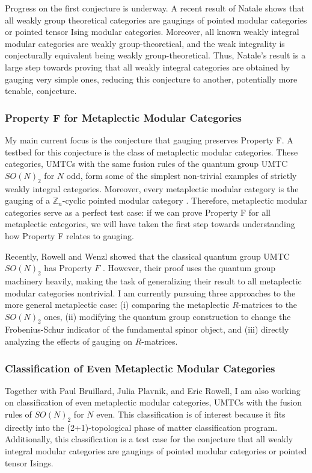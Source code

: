 \documentclass[12pt]{article}
\newcommand{\ZZ}{\mathbb{Z}}
\theoremstyle{plain} \numberwithin{equation}{section}
\theoremstyle{definition}
\begin{document}
Progress on the first conjecture is underway. A recent result of Natale \cite{n} shows that all weakly group theoretical categories are gaugings of pointed modular categories or pointed tensor Ising modular categories.  Moreover, all known weakly integral modular categories are weakly group-theoretical, and the weak integrality is conjecturally equivalent being weakly group-theoretical.  Thus, Natale's result is a large step towards proving that all weakly integral categories are obtained by gauging very simple ones, reducing this conjecture to another, potentially more tenable, conjecture.

\subsubsection*{Property F for Metaplectic Modular Categories}

My main current focus is the conjecture that gauging preserves Property F. A testbed for this conjecture is the class of metaplectic modular categories.  These categories, UMTCs with the same fusion rules of the quantum group UMTC $SO(N)_2$ for $N$ odd,  form some of the simplest non-trivial examples of strictly weakly integral categories.   Moreover, every metaplectic modular category is the gauging of a $\ZZ_n$-cyclic pointed modular category \cite{acrw}.  Therefore, metaplectic modular categories serve as a perfect test case:  if we can prove Property F for all metaplectic categories, we will have taken the first step towards understanding how Property F relates to gauging.  

Recently,  Rowell and Wenzl showed that the classical quantum group UMTC $SO(N)_2$ has Property $F$ \cite{rw}.  However, their proof uses the quantum group machinery heavily, making the task of generalizing their result to all metaplectic modular categories nontrivial.  I am currently pursuing three approaches  to the more general metaplectic case: (i) comparing the metaplectic $R$-matrices to the $SO(N)_2$ ones, (ii) modifying the quantum group construction to change the Frobenius-Schur indicator of the fundamental spinor object, and (iii) directly analyzing the effects of gauging on $R$-matrices.

\subsubsection*{Classification of Even Metaplectic Modular Categories}

Together with Paul Bruillard, Julia Plavnik, and Eric Rowell, I am also working on classification of even metaplectic modular categories, UMTCs with the fusion rules of $SO(N)_2$ for $N$ even. This classification is of interest because it fits directly into the (2+1)-topological phase of matter classification program.  Additionally, this classification is a test case for the conjecture that all weakly integral modular categories are gaugings of pointed modular categories or pointed tensor Isings.
\end{document}
